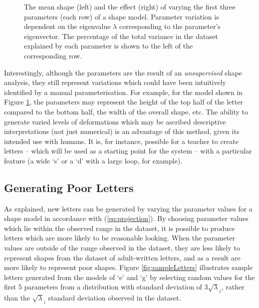 \documentclass{sig-alternate}
\begin{document}
\begin{figure}[thpb]
\centering
{}
\caption[The mean shape and the effect of varying the first three parameters of
the shape model derived from PCA from the dataset of print `s'
shapes.]{\label{fig:deviations_sPrint}The mean shape (left) and the effect
    (right) of varying the first three parameters (each row) of a shape model.
     Parameter variation is dependent on the eigenvalue $\lambda$ corresponding to
the parameter's eigenvector. The percentage of the total variance in the dataset
explained by each parameter is shown to the left of the corresponding row. }

\end{figure}



Interestingly, although the parameters are the result of an \emph{unsupervised} 
shape analysis, they still represent variations which could have
been intuitively identified by a manual parameterisation. For example, for the
model shown in Figure \ref{fig:deviations_sPrint}, the parameters may represent
the height of the top half of the letter compared to the bottom half, the width
of the overall shape, etc. The ability to generate varied levels of deformations
which may be ascribed descriptive interpretations (not just numerical) is an
advantage of this method, given its intended use with humans. It is, for instance,
possible for a teacher to create letters -- which will be used as a starting point
for the system -- with a particular feature (a wide
`s' or a `d' with a large loop, for example).


\subsection{Generating Poor Letters}

As explained, new letters can be generated by varying the parameter values 
for a shape model in accordance with (\ref{eq:projection}). By choosing
parameter values which lie within the observed range in the dataset, it is
possible to produce letters which are more likely to be reasonable looking.
When the parameter values are outside of the range observed in the dataset, they
are less likely to represent shapes from the dataset of adult-written letters, 
and as a result are more likely to represent poor shapes.
Figure \ref{fig:sampleLetters} illustrates sample letters generated from the
models of `e' and `g' by selecting random values for the first 5 parameters 
from a distribution with
standard deviation of $3\sqrt\lambda_i$, rather than the $\sqrt\lambda_i$
standard deviation observed in the dataset.
\end{document}
